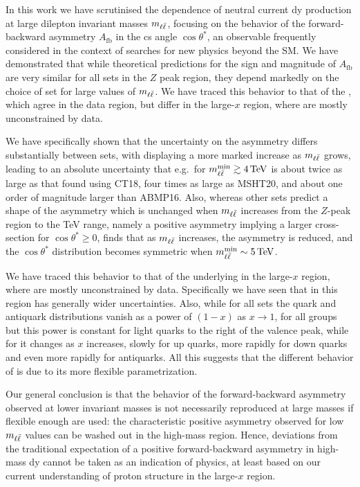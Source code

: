 
In this work we have scrutinised the \pdf dependence of  neutral current
\acrlong{dy} production
at large dilepton invariant masses $m_{\ell\bar{\ell}}$, focusing on the behavior
of the forward-backward asymmetry $A_{\text{fb}}$
in the \acrlong{cs} angle $\cos\theta^*$, an observable frequently
considered in the context of searches for new physics beyond the SM.
%
We have demonstrated that while theoretical
predictions for the sign and magnitude of $A_{\text{fb}}$ are very
similar for all \pdf sets in the
$Z$ peak region, they
depend markedly on the choice of \pdf set for  large values of $m_{\ell\bar{\ell}}$. 
We have traced this behavior to that of the \pdfs, which agree in the
data region, but differ in the large-$x$
region, where \pdfs are mostly unconstrained by data.

We have specifically shown that the uncertainty on the asymmetry
differs substantially between \pdf sets, with  displaying
a more marked increase as  $m_{\ell\bar{\ell}}$ grows, leading to
an absolute uncertainty that e.g.\ for $\mll^{\text{min}}\gtrsim\SI{4}{\tera\electronvolt}$
is about twice as large as that found using CT18, 
four times as large as MSHT20,
and about one order of magnitude larger than ABMP16.
%
Also, whereas other \pdf sets predict a shape of the asymmetry
which is unchanged when  $m_{\ell\bar{\ell}}$ increases from the $Z$-peak region to
the TeV range, namely a 
positive
asymmetry implying a larger cross-section  for $\cos\theta^*\ge 0$,  finds that as
$m_{\ell\bar{\ell}}$ increases, the asymmetry is reduced, and the $\cos\theta^*$ distribution
becomes symmetric when $\mll^{\text{min}}\sim\SI{5}{\tera\electronvolt}$.

We have traced this behavior to that of the underlying
\pdfs in the large-$x$ region, where \pdfs are mostly unconstrained by
data.
%
Specifically we have seen that in this region  has
generally wider uncertainties.
%
Also, while for  all \pdf  sets the
quark and antiquark distributions vanish as
a power of $(1-x)$ as $x\to 1$, for all groups but  this power is
constant for light quarks to the right of the valence peak, while for
 it changes as $x$ increases, slowly for up quarks, more rapidly
for down quarks and even more rapidly for antiquarks.
%
All this suggests that the different behavior of
 is due to its more flexible \pdf parametrization.

Our general conclusion is that the 
behavior of the forward-backward asymmetry
observed at lower invariant masses is not necessarily reproduced at
large masses if flexible enough
\pdfs are used:  the characteristic positive asymmetry observed
for low $m_{\ell\bar{\ell}}$ values
can be washed out in the high-mass region.
%
Hence, deviations from the traditional expectation of a positive forward-backward
asymmetry in high-mass \acrlong{dy} cannot be taken as an indication of 
\bsm physics,
at least based on  our current understanding of proton structure in the large-$x$ region.

